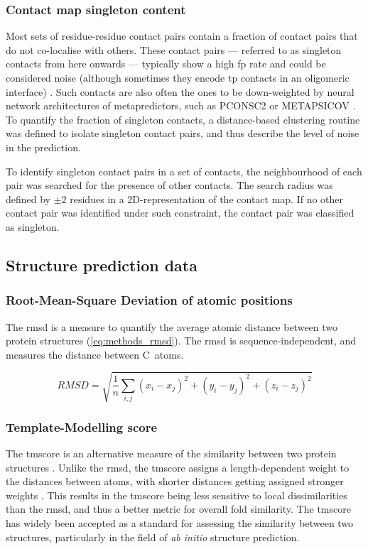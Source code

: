 \subsubsection{Contact map singleton content}
Most sets of residue-residue contact pairs contain a fraction of contact pairs that do not co-localise with others. These contact pairs --- referred to as singleton contacts from here onwards --- typically show a high \gls{fp} rate and could be considered noise (although sometimes they encode \gls{tp} contacts in an oligomeric interface) \cite{Skwark2014-qp}. Such contacts are also often the ones to be down-weighted by neural network architectures of metapredictors, such as PCONSC2 \cite{Skwark2014-qp} or METAPSICOV \cite{Jones2015-vq}. To quantify the fraction of singleton contacts, a distance-based clustering routine was defined to isolate singleton contact pairs, and thus describe the level of noise in the prediction.

To identify singleton contact pairs in a set of contacts, the neighbourhood of each pair was searched for the presence of other contacts. The search radius was defined by $\pm2$ residues in a 2D-representation of the contact map. If no other contact pair was identified under such constraint, the contact pair was classified as singleton.

\subsection{Structure prediction data}
\subsubsection{Root-Mean-Square Deviation of atomic positions}
The \gls{rmsd} is a measure to quantify the average atomic distance between two protein structures (\cref{eq:methods_rmsd}). The \gls{rmsd} is sequence-independent, and measures the distance between C\textalpha\ atoms.

\begin{equation}
    RMSD=\sqrt{\frac{1}{n}\sum_{i,j}{(x_i-x_j)^2+(y_i-y_j)^2+(z_i-z_j)^2}}
    \label{eq:methods_rmsd}
\end{equation}

\subsubsection{Template-Modelling score}
The \gls{tmscore} is an alternative measure of the similarity between two protein structures \cite{Zhang2004-ha}. Unlike the \gls{rmsd}, the \gls{tmscore} assigns a length-dependent weight to the distances between atoms, with shorter distances getting assigned stronger weights \cite{Zhang2004-ha}. This results in the \gls{tmscore} being less sensitive to local dissimilarities than the \gls{rmsd}, and thus a better metric for overall fold similarity. The \gls{tmscore} has widely been accepted as a standard for assessing the similarity between two structures, particularly in the field of \textit{ab initio} structure prediction.

